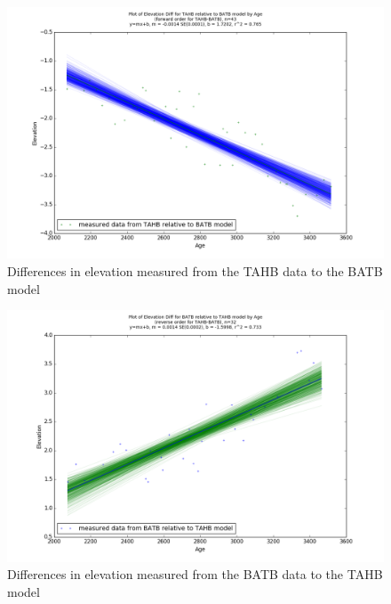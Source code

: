 \newpage

\begin{figure}[h]
	\includegraphics[width=0.9\linewidth]{data/bothNonZero/withinSeventyFivePercent/gias/theGIA_TAHB_relative_to_BATB.png}
	\caption{Differences in elevation measured from the TAHB data to the BATB model}
	\label{fig:gias_TAHBxBATB}
\end{figure}
\newpage


\begin{figure}[h]
	\includegraphics[width=0.9\linewidth]{data/bothNonZero/withinSeventyFivePercent/gias/theGIA_BATB_relative_to_TAHB.png}
	\caption{Differences in elevation measured from the BATB data to the TAHB model}
	\label{fig:gias_BATBxTAHB}
\end{figure}
\newpage








